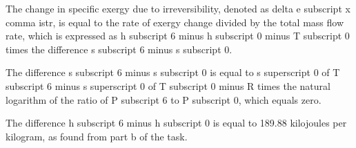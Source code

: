 The change in specific exergy due to irreversibility, denoted as delta e subscript x comma istr, is equal to the rate of exergy change divided by the total mass flow rate, which is expressed as h subscript 6 minus h subscript 0 minus T subscript 0 times the difference s subscript 6 minus s subscript 0.

The difference s subscript 6 minus s subscript 0 is equal to s superscript 0 of T subscript 6 minus s superscript 0 of T subscript 0 minus R times the natural logarithm of the ratio of P subscript 6 to P subscript 0, which equals zero.

The difference h subscript 6 minus h subscript 0 is equal to 189.88 kilojoules per kilogram, as found from part b of the task.